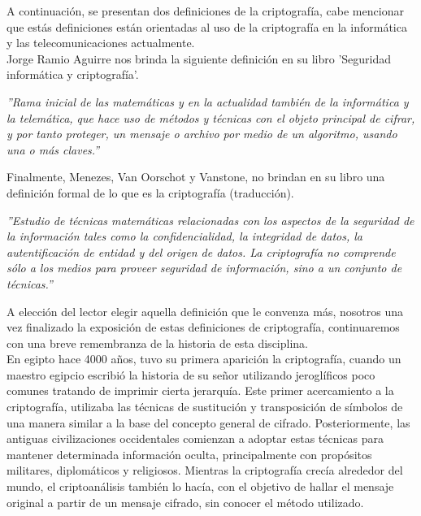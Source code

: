 \documentclass[12pt, a4paper, titlepage]{report}
\begin{document}
                A continuación, se presentan dos definiciones de la criptografía, cabe mencionar que estás definiciones están orientadas al uso de la criptografía en la informática y las telecomunicaciones actualmente.\\
                Jorge Ramio Aguirre nos brinda la siguiente definición en su libro 'Seguridad informática y criptografía'. \cite{refRamioAguirre}
                \begin{center}
                    \textit{''Rama inicial de las matemáticas y en la actualidad también de la informática y la telemática, que hace uso de métodos y técnicas con el objeto principal de cifrar, y por tanto proteger, un mensaje o archivo por medio de un algoritmo, usando una o más claves.''}
                \end{center}
                Finalmente, Menezes, Van Oorschot y Vanstone, no brindan en su libro una definición formal de lo que es la criptografía (traducción). \cite{refHandBookOfAppliedCryptography}
                \begin{center}
                    \textit{''Estudio de técnicas matemáticas relacionadas con los aspectos de la seguridad de la información tales como la confidencialidad, la integridad de datos, la autentificación de entidad y del origen de datos. La criptografía no comprende sólo a los medios para proveer seguridad de información, sino a un conjunto de técnicas.''}
                \end{center}
                A elección del lector elegir aquella definición que le convenza más, nosotros una vez finalizado la exposición de estas definiciones de criptografía, continuaremos con una breve remembranza de la historia de esta disciplina.\\
                
                En egipto hace 4000 años, tuvo su primera aparición la criptografía, cuando un maestro egipcio escribió la historia de su señor utilizando jeroglíficos poco comunes tratando de imprimir cierta jerarquía. Este primer acercamiento a la criptografía, utilizaba las técnicas de sustitución y transposición de símbolos de una manera similar a la base del concepto general de cifrado. Posteriormente, las antiguas civilizaciones occidentales comienzan a adoptar estas técnicas para mantener determinada información oculta, principalmente con propósitos militares, diplomáticos y religiosos. Mientras la criptografía crecía alrededor del mundo, el criptoanálisis también lo hacía, con el objetivo de hallar el mensaje original a partir de un mensaje cifrado, sin conocer el método utilizado. \cite{refSandra}\cite{refCriptografia}\\
                
\end{document}
